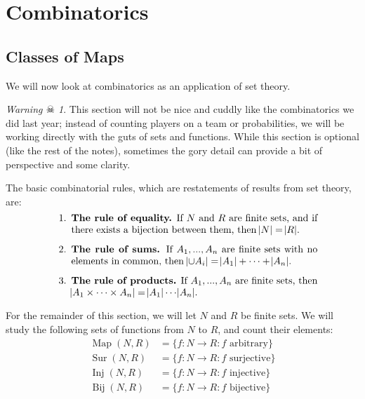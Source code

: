 \documentclass[a4paper,leqno]{article}
\numberwithin{equation}{section}
\theoremstyle{definition}
\theoremstyle{remark}
\newtheorem{warning}[equation]{Warning $\skull$}
\newcommand{\df}[1]{\textbf{#1}}
\DeclareMathOperator{\Map}{Map}
\DeclareMathOperator{\Sur}{Sur}
\DeclareMathOperator{\Inj}{Inj}
\DeclareMathOperator{\Bij}{Bij}
\begin{document}
\section{Combinatorics}
\subsection{Classes of Maps}
We will now look at combinatorics as an application of set theory.
\begin{warning}
  This section will not be nice and cuddly like the combinatorics we did last year; instead of counting players on a team or probabilities, we
  will be working directly with the guts of sets and functions. While this section is optional (like the rest of the notes), sometimes the gory
  detail can provide a bit of perspective and some clarity.
\end{warning}

The basic combinatorial rules, which are restatements of results from set theory, are:
\begin{equation}
  \begin{minipage}{0.8\textwidth}
    \begin{enumerate}
      \item \df{The rule of equality.} If $ N $ and $ R $ are finite sets, and if there exists a bijection between them, then $ \abs{N} = \abs{R} $.
      \item \df{The rule of sums.} If $ A_1, ..., A_n $ are finite sets with no elements in common, then $ \abs{\cup A_i} = \abs{A_1} + \cdots + \abs{A_n} $.
      \item \df{The rule of products.} If $ A_1, ..., A_n $ are finite sets, then $ \abs{A_1 \times \cdots \times A_n} = \abs{A_1} \cdots \abs{A_n} $.
    \end{enumerate}
  \end{minipage}
\end{equation}

For the remainder of this section, we will let $ N $ and $ R $ be finite sets. We will study the following sets of functions from $ N $ to $ R $, and
count their elements:
\begin{equation}
  \begin{aligned}
    \Map(N,R) &= \{f : N \to R : f \text{ arbitrary}\}\\
    \Sur(N,R) &= \{f : N \to R : f \text{ surjective}\}\\
    \Inj(N,R) &= \{f : N \to R : f \text{ injective}\}\\
    \Bij(N,R) &= \{f : N \to R : f \text{ bijective}\}
  \end{aligned}
\end{equation}
\end{document}
